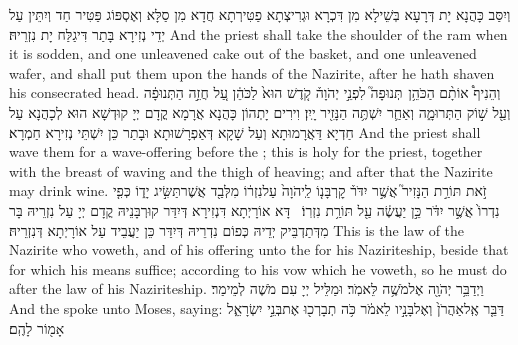 {וְיִסַּב כָּהֲנָא יָת דְּרָעָא בְּשֵׁילָא מִן דִּכְרָא וּגְרִיצְתָא פַטִּירְתָא חֲדָא מִן סַלָּא וְאֶסְפּוֹג פַּטִּיר חַד וְיִתֵּין עַל יְדֵי נְזִירָא בָּתַר דִּיגַלַּח יָת נִזְרֵיהּ׃}
{And the priest shall take the shoulder of the ram when it is sodden, and one unleavened cake out of the basket, and one unleavened wafer, and shall put them upon the hands of the Nazirite, after he hath shaven his consecrated head.}{}
{וְהֵנִיף֩ אוֹתָ֨ם הַכֹּהֵ֥ן \pasek  תְּנוּפָה֮ לִפְנֵ֣י יְהֹוָה֒ קֹ֤דֶשׁ הוּא֙ לַכֹּהֵ֔ן עַ֚ל חֲזֵ֣ה הַתְּנוּפָ֔ה וְעַ֖ל שׁ֣וֹק הַתְּרוּמָ֑ה וְאַחַ֛ר יִשְׁתֶּ֥ה הַנָּזִ֖יר יָֽיִן׃}
{וִירִים יָתְהוֹן כָּהֲנָא אֲרָמָא קֳדָם יְיָ קוּדְשָׁא הוּא לְכָהֲנָא עַל חַדְיָא דַּאֲרָמוּתָא וְעַל שָׁקָא דְּאַפְרָשׁוּתָא וּבָתַר כֵּן יִשְׁתֵּי נְזִירָא חַמְרָא׃}
{And the priest shall wave them for a wave-offering before the \lord; this is holy for the priest, together with the breast of waving and the thigh of heaving; and after that the Nazirite may drink wine.}{}
{זֹ֣את תּוֹרַ֣ת הַנָּזִיר֮ אֲשֶׁ֣ר יִדֹּר֒ קׇרְבָּנ֤וֹ לַֽיהֹוָה֙ עַל\maqqaf נִזְר֔וֹ מִלְּבַ֖ד אֲשֶׁר\maqqaf תַּשִּׂ֣יג יָד֑וֹ כְּפִ֤י נִדְרוֹ֙ אֲשֶׁ֣ר יִדֹּ֔ר כֵּ֣ן יַעֲשֶׂ֔ה עַ֖ל תּוֹרַ֥ת נִזְרֽוֹ׃ \petucha }
{דָּא אוֹרָיְתָא דִּנְזִירָא דְּיִדַּר קוּרְבָּנֵיהּ קֳדָם יְיָ עַל נִזְרֵיהּ בָּר מִדְּתַדְבֵּיק יְדֵיהּ כְּפוֹם נִדְרֵיהּ דְּיִדַּר כֵּן יַעֲבֵיד עַל אוֹרָיְתָא דְּנִזְרֵיהּ׃}
{This is the law of the Nazirite who voweth, and of his offering unto the \lord\space for his Naziriteship, beside that for which his means suffice; according to his vow which he voweth, so he must do after the law of his Naziriteship.}{}
{וַיְדַבֵּ֥ר יְהֹוָ֖ה אֶל\maqqaf מֹשֶׁ֥ה לֵּאמֹֽר׃}
{וּמַלֵּיל יְיָ עִם מֹשֶׁה לְמֵימַר׃}
{And the \lord\space spoke unto Moses, saying:}{}
{דַּבֵּ֤ר אֶֽל\maqqaf אַהֲרֹן֙ וְאֶל\maqqaf בָּנָ֣יו לֵאמֹ֔ר כֹּ֥ה תְבָרְכ֖וּ אֶת\maqqaf בְּנֵ֣י יִשְׂרָאֵ֑ל אָמ֖וֹר לָהֶֽם׃ \setuma }
